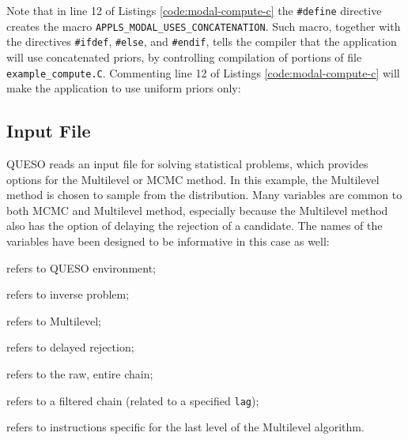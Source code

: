 




Note that in line 12 of Listings \ref{code:modal-compute-c} the \verb+#define+ directive creates the macro
 \linebreak
\verb+APPLS_MODAL_USES_CONCATENATION+. Such macro, together with the directives \verb+#ifdef+, \verb+#else+, and \verb+#endif+, tells the compiler that the application will use concatenated priors, by controlling compilation of portions of file \texttt{example\_compute.C}. Commenting line 12 of Listings \ref{code:modal-compute-c} will make the application to use uniform priors only:


 
  


\subsection{Input File}\label{sec:modal-input-file}


QUESO reads an input file for solving statistical problems, which provides options for the Multilevel or MCMC method. In this example, the Multilevel method is chosen to sample from the distribution. Many variables are common to both MCMC and Multilevel method, especially because the Multilevel method also has the option of delaying the rejection of a candidate. The names of the variables have been designed to be informative in this case as well:
\begin{description}\vspace{-8pt}
\item[ \texttt{env}:] refers to QUESO environment; \vspace{-8pt}
\item[ \texttt{ip}:] refers to inverse problem;\vspace{-8pt}
\item[ \texttt{ml}:] refers to Multilevel;\vspace{-8pt}
\item[ \texttt{dr}:] refers to delayed rejection;\vspace{-8pt}
\item[ \texttt{rawChain}:] refers to the raw, entire chain; \vspace{-8pt}
\item[ \texttt{filteredChain}:] refers to a filtered chain (related to a specified \texttt{lag});\vspace{-8pt}
\item[ \texttt{last}:] refers to instructions specific for the last level of the Multilevel algorithm.
\end{description}

